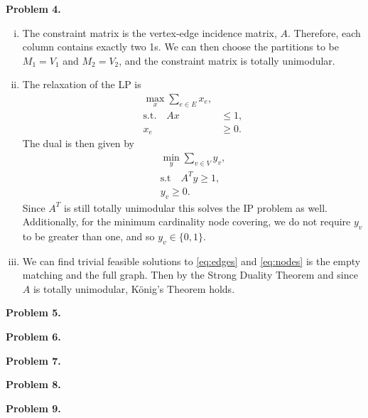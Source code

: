 \documentclass[11pt,a4paper]{article}
\begin{document}
\textbf{Problem 4.}
\begin{enumerate}[i)]
    \item The constraint matrix is the vertex-edge incidence matrix, $A$. Therefore, each column contains exactly two 1s. We can then choose the partitions to be $M_1 = V_1$ and $M_2 = V_2$, and the constraint matrix is totally unimodular.
    \item The relaxation of the LP is
    \begin{align}
        \nonumber \max_x \sum_{e \in E} x_e, \\
        \text{s.t.} \quad A x &\leq 1, \label{eq:edges} \\
        \nonumber x_e &\geq 0.
    \end{align}
    The dual is then given by
    \begin{align}
        \nonumber \min_y \sum_{v \in V} y_v, \\
        \text{s.t} \quad A^T y \geq 1, \label{eq:nodes} \\
        \nonumber y_v \geq 0.
    \end{align}
    Since $A^T$ is still totally unimodular this solves the IP problem as well. Additionally, for the minimum cardinality node covering, we do not require $y_v$ to be greater than one, and so $y_v \in \{ 0, 1 \}$.
    \item We can find trivial feasible solutions to \eqref{eq:edges} and \eqref{eq:nodes} is the empty matching and the full graph. Then by the Strong Duality Theorem and since $A$ is totally unimodular, K\"{o}nig's Theorem holds.
\end{enumerate}

\textbf{Problem 5.}

\textbf{Problem 6.}

\textbf{Problem 7.}

\textbf{Problem 8.}

\textbf{Problem 9.}


%
\end{document}

